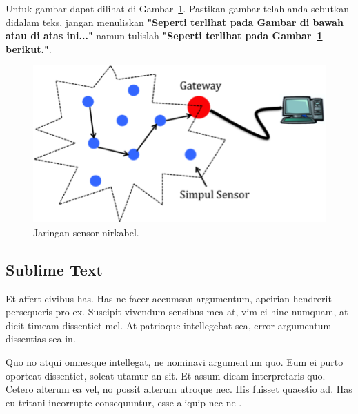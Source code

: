 Untuk gambar dapat dilihat di Gambar~\ref{wsn}. Pastikan gambar telah anda sebutkan didalam teks, jangan menuliskan \textbf{"Seperti terlihat pada Gambar di bawah atau di atas ini..."} namun tulislah \textbf{"Seperti terlihat pada Gambar~\ref{wsn} berikut."}.


      \begin{figure}[H]
        \centering
          \includegraphics{gambar/wsn}
          \caption{Jaringan sensor nirkabel.}
          \label{wsn}
      \end{figure}


  \subsection{Sublime Text}
    Et affert civibus has. Has ne facer accumsan argumentum, apeirian hendrerit persequeris pro ex. Suscipit vivendum sensibus mea at, vim ei hinc numquam, at dicit timeam dissentiet mel. At patrioque intellegebat sea, error argumentum dissentias sea in.

    Quo no atqui omnesque intellegat, ne nominavi argumentum quo. Eum ei purto oporteat dissentiet, soleat utamur an sit. Et assum dicam interpretaris quo. Cetero alterum ea vel, no possit alterum utroque nec. His fuisset quaestio ad. Has eu tritani incorrupte consequuntur, esse aliquip nec ne \parencite{basconcillo2023}.
    
    
